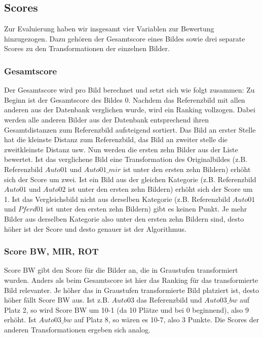 \documentclass{scrartcl}
\begin{document}
\subsection{Scores}
Zur Evaluierung haben wir insgesamt vier Variablen zur Bewertung hinzugezogen. Dazu gehören der Gesamtscore eines Bildes sowie drei separate Scores zu den Transformationen der einzelnen Bilder.

\subsubsection{Gesamtscore}
Der Gesamtscore wird pro Bild berechnet und setzt sich wie folgt zusammen: Zu Beginn ist der Gesamtscore des Bildes 0. Nachdem das Referenzbild mit allen anderen aus der Datenbank verglichen wurde, wird ein Ranking vollzogen. Dabei werden alle anderen Bilder aus der Datenbank entsprechend ihren Gesamtdistanzen zum Referenzbild aufsteigend sortiert. Das Bild an erster Stelle hat die kleinste Distanz zum Referenzbild, das Bild an zweiter stelle die zweitkleinste Distanz usw. Nun werden die ersten zehn Bilder aus der Liste bewertet. Ist das verglichene Bild eine Transformation des Originalbildes (z.B. Referenzbild $Auto01$ und $Auto01\_mir$ ist unter den ersten zehn Bildern) erhöht sich der Score um zwei. Ist ein Bild aus der gleichen Kategorie (z.B. Referenzbild $Auto01$ und $Auto02$ ist unter den ersten zehn Bildern) erhöht sich der Score um 1. Ist das Vergleichsbild nicht aus derselben Kategorie (z.B. Referenzbild $Auto01$ und $Pferd01$ ist unter den ersten zehn Bildern) gibt es keinen Punkt.
Je mehr Bilder aus derselben Kategorie also unter den ersten zehn Bildern sind, desto höher ist der Score und desto genauer ist der Algorithmus.

\subsubsection{Score BW, MIR, ROT}
Score BW gibt den Score für die Bilder an, die in Graustufen transformiert wurden. Anders als beim Gesamtscore ist hier das Ranking für das transformierte Bild relevanter. Je höher das in Graustufen transformierte Bild platziert ist, desto höher fällt Score BW aus. Ist z.B. $Auto03$ das Referenzbild und $Auto03\_bw$ auf Platz 2, so wird Score BW um 10-1 (da 10 Plätze und bei 0 beginnend), also 9 erhöht. Ist $Auto03\_bw$ auf Platz 8, so wären es 10-7, also 3 Punkte. Die Scores der anderen Transformationen ergeben sich analog.
\end{document}
